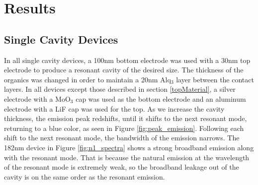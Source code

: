 \documentclass{report}
\begin{document}
\chapter{Results}

    \section{Single Cavity Devices} \label{n=1}

        In all single cavity devices, a 100nm bottom electrode was used with a 30nm top electrode to produce a resonant cavity of the desired size. The thickness of the organics was changed in order to maintain a 20nm Alq$_3$ layer between the contact layers. In all devices except those described in section \ref{topMaterial}, a silver electrode with a MoO$_3$ cap was used as the bottom electrode and an aluminum electrode with a LiF cap was used for the top. As we increase the cavity thickness, the emission peak redshifts, until it shifts to the next resonant mode, returning to a blue color, as seen in Figure \ref{fig:peak_emission}. Following each shift to the next resonant mode, the bandwidth of the emission narrows. The 182nm device in Figure \ref{fig:n1_spectra} shows a strong broadband emission along with the resonant mode. That is because the natural emission at the wavelength of the resonant mode is extremely weak, so the broadband leakage out of the cavity is on the same order as the resonant emission.
        

        \newpage
\end{document}
